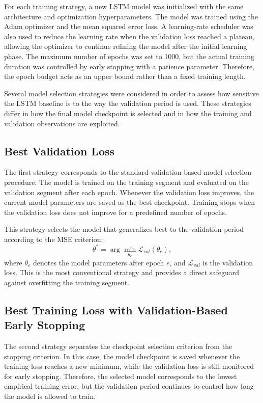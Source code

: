 For each training strategy, a new LSTM model was initialized with the same architecture and optimization hyperparameters. The model was trained using the Adam optimizer and the mean squared error loss. A learning-rate scheduler was also used to reduce the learning rate when the validation loss reached a plateau, allowing the optimizer to continue refining the model after the initial learning phase. The maximum number of epochs was set to 1000, but the actual training duration was controlled by early stopping with a patience parameter. Therefore, the epoch budget acts as an upper bound rather than a fixed training length.

Several model selection strategies were considered in order to assess how sensitive the LSTM baseline is to the way the validation period is used. These strategies differ in how the final model checkpoint is selected and in how the training and validation observations are exploited.

\subsection{Best Validation Loss}

The first strategy corresponds to the standard validation-based model selection procedure. The model is trained on the training segment and evaluated on the validation segment after each epoch. Whenever the validation loss improves, the current model parameters are saved as the best checkpoint. Training stops when the validation loss does not improve for a predefined number of epochs.

This strategy selects the model that generalizes best to the validation period according to the MSE criterion:
\[
    \theta^{*} = \arg\min_{\theta_e} \mathcal{L}_{val}(\theta_e),
\]
where \(\theta_e\) denotes the model parameters after epoch \(e\), and \(\mathcal{L}_{val}\) is the validation loss. This is the most conventional strategy and provides a direct safeguard against overfitting the training segment.

\subsection{Best Training Loss with Validation-Based Early Stopping}

The second strategy separates the checkpoint selection criterion from the stopping criterion. In this case, the model checkpoint is saved whenever the training loss reaches a new minimum, while the validation loss is still monitored for early stopping. Therefore, the selected model corresponds to the lowest empirical training error, but the validation period continues to control how long the model is allowed to train.

